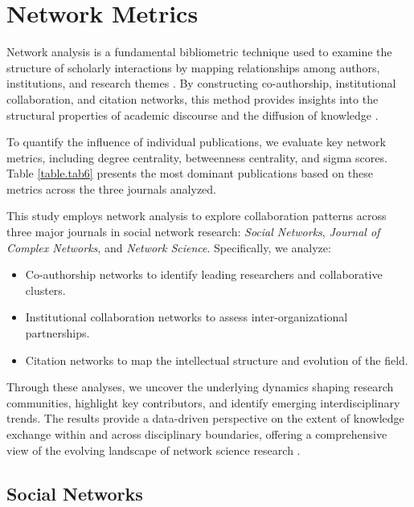 \documentclass[twocolumn]{article}
\begin{document}
		\section{Network Metrics}
		
		Network analysis is a fundamental bibliometric technique used to examine the structure of scholarly interactions by mapping relationships among authors, institutions, and research themes \cite{Newman2001, Barabasi2002, Borgatti2009}. By constructing co-authorship, institutional collaboration, and citation networks, this method provides insights into the structural properties of academic discourse and the diffusion of knowledge \cite{Otte2002, Liu2005}.
		
		To quantify the influence of individual publications, we evaluate key network metrics, including degree centrality, betweenness centrality, and sigma scores. Table \ref{table.tab6} presents the most dominant publications based on these metrics across the three journals analyzed.
		
		
		
		This study employs network analysis to explore collaboration patterns across three major journals in social network research: \textit{Social Networks}, \textit{Journal of Complex Networks}, and \textit{Network Science}. Specifically, we analyze: \begin{itemize} \item Co-authorship networks to identify leading researchers and collaborative clusters. \item Institutional collaboration networks to assess inter-organizational partnerships. \item Citation networks to map the intellectual structure and evolution of the field. \end{itemize}
		
		Through these analyses, we uncover the underlying dynamics shaping research communities, highlight key contributors, and identify emerging interdisciplinary trends. The results provide a data-driven perspective on the extent of knowledge exchange within and across disciplinary boundaries, offering a comprehensive view of the evolving landscape of network science research \cite{Glanzel2004, Waltman2014}.
		
		
		
		
		
		\subsection*{Social Networks}
		
		
		
	\pagebreak
	
	
	
\end{document}
